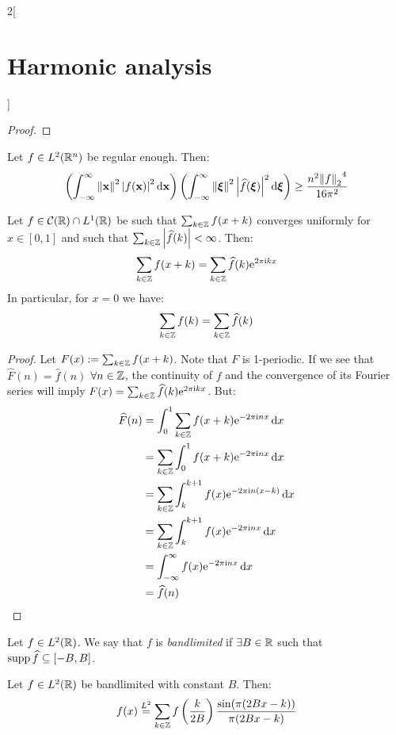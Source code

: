 \documentclass[../../../main_math.tex]{subfiles}
\begin{document}
\begin{multicols}{2}[\section{Harmonic analysis}]
\begin{proof}
  \end{proof}
  \begin{theorem}
    Let $f\in L^2(\mathbb{R}^n)$ be regular enough. Then:
    $$\left(\int_{-\infty}^\infty \left\|\boldsymbol{\mathrm{x}}\right\|^2 \abs{f(\boldsymbol{\mathrm{x}})}^2\dd{\boldsymbol{\mathrm{x}}}\right)\left(\int_{-\infty}^\infty \left\|\boldsymbol{\mathrm{\xi}}\right\|^2 \abs{\widehat{f}(\boldsymbol{\mathrm{\xi}})}^2\dd{\boldsymbol{\mathrm{\xi}}}\right)\geq \frac{n^2{\left\|f\right\|_2}^4}{16\pi^2}$$
  \end{theorem}
  \begin{theorem}
    Let $f\in\mathcal{C}(\mathbb{R})\cap L^1(\mathbb{R})$ be such that $\sum_{k\in\mathbb{Z}}f(x+k)$ converges uniformly for $x\in[0,1]$ and such that $\sum_{k\in\mathbb{Z}}\abs{\widehat{f}(k)}<\infty$. Then:
    $$\sum_{k\in\mathbb{Z}}f(x+k)=\sum_{k\in\mathbb{Z}}\widehat{f}(k)\mathrm{e}^{2\pi\mathrm{i} k x}$$
    In particular, for $x=0$ we have:
    $$\sum_{k\in\mathbb{Z}}f(k)=\sum_{k\in\mathbb{Z}}\widehat{f}(k)$$
  \end{theorem}
  \begin{proof}
    Let $F(x):=\sum_{k\in\mathbb{Z}}f(x+k)$. Note that $F$ is 1-periodic. If we see that $\widehat{F}(n)=\widehat{f}(n)$ $\forall n\in\mathbb{Z}$, the continuity of $f$ and the convergence of its Fourier series will imply $F(x)=\sum_{k\in\mathbb{Z}}\widehat{f}(k)\mathrm{e}^{2\pi\mathrm{i} k x}$. But:
    \begin{align*}
      \widehat{F}(n) & =\int_{0}^{1}\sum_{k\in\mathbb{Z}}f(x+k)\mathrm{e}^{-2\pi\mathrm{i} n x}\dd{x}     \\
                     & =\sum_{k\in\mathbb{Z}}\int_{0}^{1}f(x+k)\mathrm{e}^{-2\pi\mathrm{i} n x}\dd{x}     \\
                     & =\sum_{k\in\mathbb{Z}}\int_{k}^{k+1}f(x)\mathrm{e}^{-2\pi\mathrm{i} n (x-k)}\dd{x} \\
                     & =\sum_{k\in\mathbb{Z}}\int_{k}^{k+1}f(x)\mathrm{e}^{-2\pi\mathrm{i} n x}\dd{x}     \\
                     & =\int_{-\infty}^{\infty}f(x)\mathrm{e}^{-2\pi\mathrm{i} n x}\dd{x}          \\
                     & =\widehat{f}(n)
    \end{align*}
  \end{proof}
  \begin{definition}
    Let $f\in L^2(\mathbb{R})$. We say that $f$ is \emph{bandlimited} if $\exists B\in\mathbb{R}$ such that $\operatorname{supp}\widehat{f}\subseteq[-B,B]$.
  \end{definition}
  \begin{theorem}
    Let $f\in L^2(\mathbb{R})$ be bandlimited with constant $B$. Then:
    $$f(x)\overset{L^2}{=}\sum_{k\in\mathbb{Z}}f\left(\frac{k}{2B}\right)\frac{\sin(\pi(2Bx-k))}{\pi(2Bx-k)}$$

\end{theorem}
\end{multicols}
\end{document}
